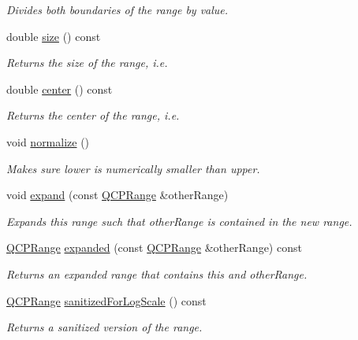 \begin{DoxyCompactItemize}
\begin{DoxyCompactList}\small\item\em Divides both boundaries of the range by {\itshape value}. \end{DoxyCompactList}\item 
double \hyperlink{classQCPRange_afa57c13049b965edb6fd1c00ac56338a}{size} () const 
\begin{DoxyCompactList}\small\item\em Returns the size of the range, i.\+e. \end{DoxyCompactList}\item 
double \hyperlink{classQCPRange_a3825b53cf17da5de0843c1f3baad07db}{center} () const 
\begin{DoxyCompactList}\small\item\em Returns the center of the range, i.\+e. \end{DoxyCompactList}\item 
void \hyperlink{classQCPRange_af914a7740269b0604d0827c634a878a9}{normalize} ()
\begin{DoxyCompactList}\small\item\em Makes sure {\itshape lower} is numerically smaller than {\itshape upper}. \end{DoxyCompactList}\item 
void \hyperlink{classQCPRange_a0fa1bc8048be50d52bea93a8caf08305}{expand} (const \hyperlink{classQCPRange}{Q\+C\+P\+Range} \&other\+Range)
\begin{DoxyCompactList}\small\item\em Expands this range such that {\itshape other\+Range} is contained in the new range. \end{DoxyCompactList}\item 
\hyperlink{classQCPRange}{Q\+C\+P\+Range} \hyperlink{classQCPRange_a6437bdf29a7ebc2c88a6045c4e622384}{expanded} (const \hyperlink{classQCPRange}{Q\+C\+P\+Range} \&other\+Range) const 
\begin{DoxyCompactList}\small\item\em Returns an expanded range that contains this and {\itshape other\+Range}. \end{DoxyCompactList}\item 
\hyperlink{classQCPRange}{Q\+C\+P\+Range} \hyperlink{classQCPRange_aaf6a9046e78d91eeb8e89584fe46b034}{sanitized\+For\+Log\+Scale} () const 
\begin{DoxyCompactList}\small\item\em Returns a sanitized version of the range. \end{DoxyCompactList}\item 

\end{DoxyCompactItemize}
